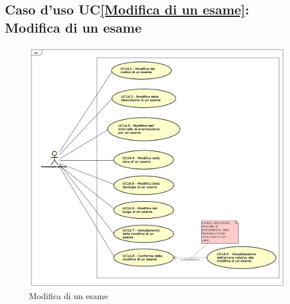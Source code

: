 \subsection{Caso d'uso UC\ref{Modifica di un esame}: Modifica di un esame}
\begin{figure} [H]
	\centering
	\includegraphics[scale=0.45]{./img/UseCaseDiagram014.png}
	\caption{Modifica di un esame}\label{}
\end{figure}
